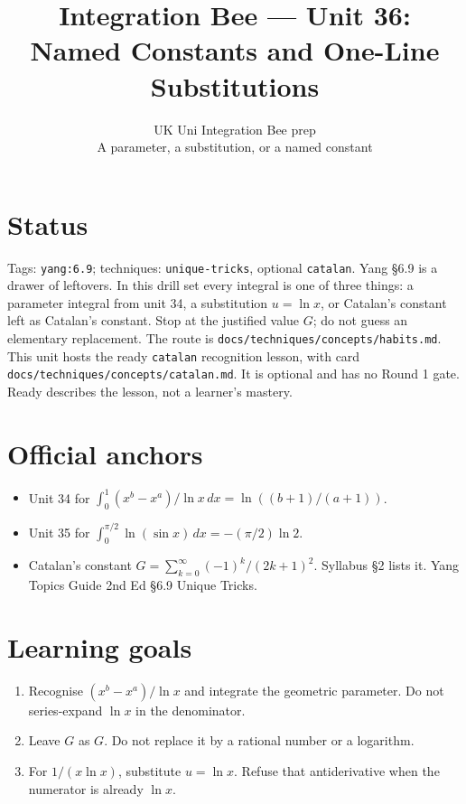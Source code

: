 
\title{Integration Bee --- Unit 36:\\ Named Constants and One-Line Substitutions}
\author{UK Uni Integration Bee prep\\ A parameter, a substitution, or a named constant}
\date{}

\maketitle
\section*{Status}
Tags: \texttt{yang:6.9}; techniques: \texttt{unique-tricks}, optional \texttt{catalan}.
Yang \S6.9 is a drawer of leftovers. In this drill set every integral is one of three things: a parameter integral from unit 34, a substitution $u=\ln x$, or Catalan's constant left as Catalan's constant. Stop at the justified value $G$; do not guess an elementary replacement. The route is \texttt{docs/techniques/concepts/habits.md}. This unit hosts the ready \texttt{catalan} recognition lesson, with card \texttt{docs/techniques/concepts/catalan.md}. It is optional and has no Round 1 gate. Ready describes the lesson, not a learner's mastery.
\section{Official anchors}
\begin{itemize}
\item Unit 34 for $\int_0^1 (x^b-x^a)/\ln x\,dx=\ln((b+1)/(a+1))$.
\item Unit 35 for $\int_0^{\pi/2}\ln(\sin x)\,dx=-(\pi/2)\ln 2$.
\item Catalan's constant $G=\sum_{k=0}^{\infty}(-1)^k/(2k+1)^2$. Syllabus \S2 lists it. Yang Topics Guide 2nd Ed \S6.9 Unique Tricks.
\end{itemize}
\section{Learning goals}
\begin{enumerate}
  \item Recognise $(x^b-x^a)/\ln x$ and integrate the geometric parameter. Do not series-expand $\ln x$ in the denominator.
  \item Leave $G$ as $G$. Do not replace it by a rational number or a logarithm.
  \item For $1/(x\ln x)$, substitute $u=\ln x$. Refuse that antiderivative when the numerator is already $\ln x$.
\end{enumerate}

